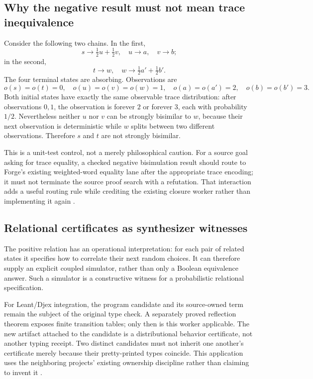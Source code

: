 \documentclass[11pt,letterpaper]{article}
\theoremstyle{definition}\newtheorem{definition}[theorem]{Definition}
\theoremstyle{remark}\newtheorem{remark}[theorem]{Remark}
\begin{document}
\subsection{Why the negative result must not mean trace inequivalence}\label{sec:trace-control}
Consider the following two chains. In the first,
\[
 s\longrightarrow\tfrac12u+\tfrac12v,
 \quad u\longrightarrow a,\quad v\longrightarrow b;
\]
in the second,
\[
 t\longrightarrow w,
 \quad w\longrightarrow\tfrac12a'+\tfrac12b'.
\]
The four terminal states are absorbing. Observations are
\[
 o(s)=o(t)=0,
 \quad o(u)=o(v)=o(w)=1,
 \quad o(a)=o(a')=2,
 \quad o(b)=o(b')=3.
\]
Both initial states have exactly the same observable trace distribution: after observations $0,1$, the observation is forever $2$ or forever $3$, each with probability $1/2$. Nevertheless neither $u$ nor $v$ can be strongly bisimilar to $w$, because their next observation is deterministic while $w$ splits between two different observations. Therefore $s$ and $t$ are not strongly bisimilar.

This is a unit-test control, not a merely philosophical caution. For a source goal asking for trace equality, a checked negative bisimulation result should route to Forge's existing weighted-word equality lane after the appropriate trace encoding; it must not terminate the source proof search with a refutation. That interaction adds a useful routing rule while crediting the existing closure worker rather than implementing it again \cite{forge-closure}.

\subsection{Relational certificates as synthesizer witnesses}
The positive relation has an operational interpretation: for each pair of related states it specifies how to correlate their next random choices. It can therefore supply an explicit coupled simulator, rather than only a Boolean equivalence answer. Such a simulator is a constructive witness for a probabilistic relational specification.

For Leant/Djex integration, the program candidate and its source-owned term remain the subject of the original type check. A separately proved reflection theorem exposes finite transition tables; only then is this worker applicable. The new artifact attached to the candidate is a distributional behavior certificate, not another typing receipt. Two distinct candidates must not inherit one another's certificate merely because their pretty-printed types coincide. This application uses the neighboring projects' existing ownership discipline rather than claiming to invent it \cite{leant,djex,forge-neighbors}.
\end{document}
